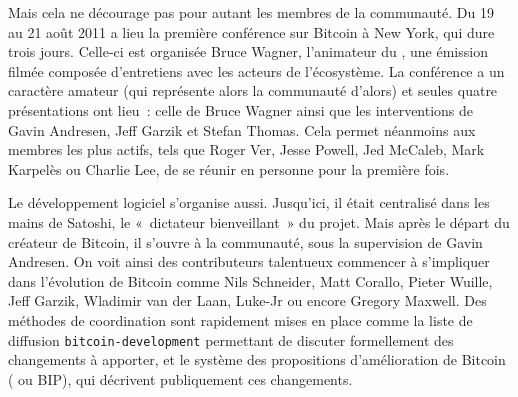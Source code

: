 
Mais cela ne décourage pas pour autant les membres de la communauté. Du 19 au 21 août 2011 a lieu la première conférence sur Bitcoin à New York, qui dure trois jours. Celle-ci est organisée Bruce Wagner, l'animateur du , une émission filmée composée d'entretiens avec les acteurs de l'écosystème. La conférence a un caractère amateur (qui représente alors la communauté d'alors) et seules quatre présentations ont lieu~: celle de Bruce Wagner ainsi que les interventions de Gavin Andresen, Jeff Garzik et Stefan Thomas. Cela permet néanmoins aux membres les plus actifs, tels que Roger Ver, Jesse Powell, Jed McCaleb, Mark Karpelès ou Charlie Lee, de se réunir en personne pour la première fois.

Le développement logiciel s'organise aussi. Jusqu'ici, il était centralisé dans les mains de Satoshi, le «~dictateur bienveillant~» du projet. Mais après le départ du créateur de Bitcoin, il s'ouvre à la communauté, sous la supervision de Gavin Andresen. On voit ainsi des contributeurs talentueux commencer à s'impliquer dans l'évolution de Bitcoin comme Nils Schneider, Matt Corallo, Pieter Wuille, Jeff Garzik, Wladimir van der Laan, Luke-Jr ou encore Gregory Maxwell. Des méthodes de coordination sont rapidement mises en place comme la liste de diffusion \verb?bitcoin-development? permettant de discuter formellement des changements à apporter, et le système des propositions d'amélioration de Bitcoin ( ou BIP), qui décrivent publiquement ces changements.

